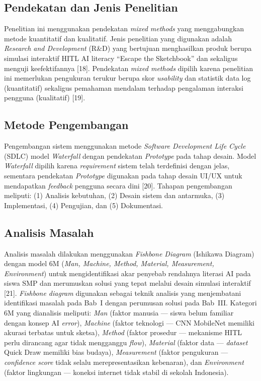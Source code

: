 \documentclass[10pt,twoside,openright]{report}
\begin{document}
\subsection{Pendekatan dan Jenis Penelitian}
Penelitian ini menggunakan pendekatan \textit{mixed methods} yang menggabungkan metode kuantitatif dan kualitatif. Jenis penelitian yang digunakan adalah \textit{Research and Development} (R\&D) yang bertujuan menghasilkan produk berupa simulasi interaktif HITL AI literacy ``Escape the Sketchbook'' dan sekaligus menguji keefektifannya [18]. Pendekatan \textit{mixed methods} dipilih karena penelitian ini memerlukan pengukuran terukur berupa skor \textit{usability} dan statistik data log (kuantitatif) sekaligus pemahaman mendalam terhadap pengalaman interaksi pengguna (kualitatif) [19].

\subsection{Metode Pengembangan}
Pengembangan sistem menggunakan metode \textit{Software Development Life Cycle} (SDLC) model \textit{Waterfall} dengan pendekatan \textit{Prototype} pada tahap desain. Model \textit{Waterfall} dipilih karena \textit{requirement} sistem telah terdefinisi dengan jelas, sementara pendekatan \textit{Prototype} digunakan pada tahap desain UI/UX untuk mendapatkan \textit{feedback} pengguna secara dini [20]. Tahapan pengembangan meliputi: (1) Analisis kebutuhan, (2) Desain sistem dan antarmuka, (3) Implementasi, (4) Pengujian, dan (5) Dokumentasi.

\subsection{Analisis Masalah}
Analisis masalah dilakukan menggunakan \textit{Fishbone Diagram} (Ishikawa Diagram) dengan model 6M (\textit{Man, Machine, Method, Material, Measurement, Environment}) untuk mengidentifikasi akar penyebab rendahnya literasi AI pada siswa SMP dan merumuskan solusi yang tepat melalui desain simulasi interaktif [21]. \textit{Fishbone diagram} digunakan sebagai teknik analisis yang menjembatani identifikasi masalah pada Bab~I dengan perumusan solusi pada Bab~III. Kategori 6M yang dianalisis meliputi: \textit{Man} (faktor manusia — siswa belum familiar dengan konsep AI \textit{error}), \textit{Machine} (faktor teknologi — CNN MobileNet memiliki akurasi terbatas untuk sketsa), \textit{Method} (faktor prosedur — mekanisme HITL perlu dirancang agar tidak mengganggu \textit{flow}), \textit{Material} (faktor data — \textit{dataset} Quick Draw memiliki bias budaya), \textit{Measurement} (faktor pengukuran — \textit{confidence score} tidak selalu merepresentasikan kebenaran), dan \textit{Environment} (faktor lingkungan — koneksi internet tidak stabil di sekolah Indonesia).
\end{document}
